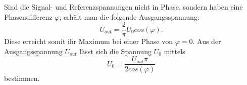 \noindent Sind die Signal- und Referenzspannungen nicht in Phase, sondern haben eine 
Phasendifferenz $\varphi$, erhält man die folgende Ausgangsspannung: 
\begin{equation}
    U_{out} = \frac{2}{\pi} U_{0} cos(\varphi).
    \label{eqn:u_out}
\end{equation}
Diese erreicht somit ihr Maximum bei einer Phase von $\varphi = 0$.
Aus der Ausgangsspannung $U_{out}$ lässt sich die Spannung $U_{0}$ mittels
\begin{equation}
    U_{0} = \frac{U_{out} \pi}{2 cos(\varphi)} %
    \label{eqn:u_0}
\end{equation}
bestimmen.